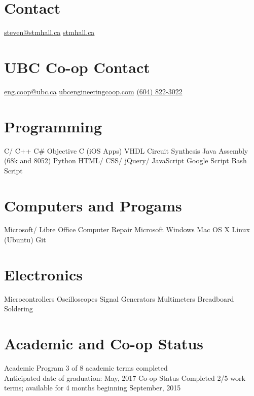 \documentclass[]{friggeri-cv} %
\begin{document}


\begin{aside} %
\section{Contact}
\href{mailto:steven@stmhall.ca}{steven@stmhall.ca}
\href{http://stmhall.ca}{stmhall.ca}
\section{UBC Co-op Contact}
\href{mailto:eng.coop@ubc.ca}{eng.coop@ubc.ca}
\href{http://www.ubcengineeringcoop.com}{ubcengineeringcoop.com}
\href{tel:604-822-3022}{(604) 822-3022}
\section{Programming}
C/ C++
C\#
Objective C (iOS Apps)
VHDL Circuit Synthesis
Java
Assembly (68k and 8052)
Python
HTML/ CSS/ jQuery/ JavaScript
Google Script
Bash Script
\section{Computers and Progams}
Microsoft/ Libre Office
Computer Repair
Microsoft Windows
Mac OS X
Linux (Ubuntu)
Git
\section{Electronics}
Microcontrollers
Oscilloscopes
Signal Generators
Multimeters
Breadboard
Soldering
\end{aside}

\section{Academic and Co-op Status}

\begin{entrylist}

\entry
{}
{Academic Program}
{}
{3 of 8 academic terms completed\\
Anticipated date of graduation: May, 2017
}
\entry
{}
{Co-op Status}
{}
{Completed 2/5 work terms; available for 4 months beginning September,
2015
}
\end{entrylist}
\end{document}
